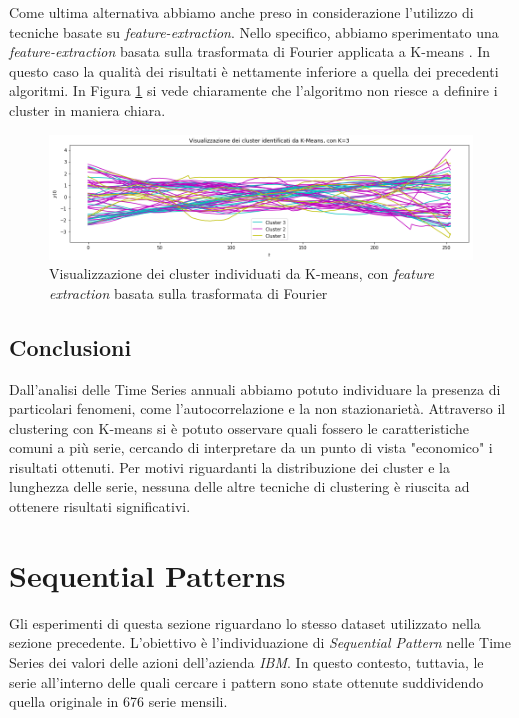 \documentclass[a4paper]{article}
\begin{document}
Come ultima alternativa abbiamo anche preso in considerazione l'utilizzo di tecniche basate su \textit{feature-extraction}. Nello specifico, abbiamo sperimentato una \textit{feature-extraction} basata sulla trasformata di Fourier applicata a K-means \cite{introtodm}. In questo caso la qualità dei risultati è nettamente inferiore a quella dei precedenti algoritmi. In Figura \ref{fig:fourier_cluster} si vede chiaramente che l'algoritmo non riesce a definire i cluster in maniera chiara.

\begin{figure}[h]
\includegraphics[width=\textwidth]{images/fourier_clusters.png}
\caption{Visualizzazione dei cluster individuati da K-means, con \textit{feature extraction} basata sulla trasformata di Fourier}
\label{fig:fourier_cluster}
\end{figure}

\subsection{Conclusioni}

Dall'analisi delle Time Series annuali abbiamo potuto individuare la presenza di particolari fenomeni, come l'autocorrelazione e la non stazionarietà. Attraverso il clustering con K-means si è potuto osservare quali fossero le caratteristiche comuni a più serie, cercando di interpretare da un punto di vista "economico" i risultati ottenuti. Per motivi riguardanti la distribuzione dei cluster e la lunghezza delle serie, nessuna delle altre tecniche di clustering è riuscita ad ottenere risultati significativi.

\newpage

\section{Sequential Patterns}

Gli esperimenti di questa sezione riguardano lo stesso dataset utilizzato nella sezione precedente. L'obiettivo è l'individuazione di \textit{Sequential Pattern} nelle Time Series dei valori delle azioni dell'azienda \textit{IBM}. In questo contesto, tuttavia, le serie all'interno delle quali cercare i pattern sono state ottenute suddividendo quella originale in 676 serie mensili. 
\end{document}

